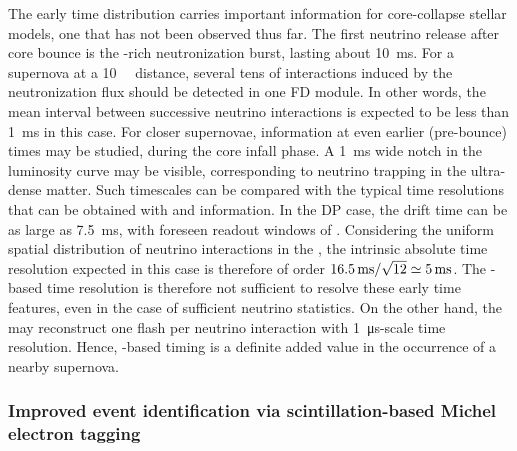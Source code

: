 The early time distribution carries important information for core-collapse stellar models, one that has not been observed thus far. The first neutrino release after core bounce is the \nue-rich neutronization burst, lasting about \SI{10}{\ms}. For a supernova at a \SI{10}{\kilo\parsec} distance, several tens of interactions induced by the neutronization flux should be detected in one FD module. In other words, the mean interval between successive neutrino interactions is expected to be less than \SI{1}{\ms} in this case. For closer supernovae, information at even earlier (pre-bounce) times may be studied, during the core infall phase. A \SI{1}{\ms} wide notch in the luminosity curve may be visible, corresponding to neutrino trapping in the ultra-dense matter. Such timescales can be compared with the typical time resolutions that can be obtained with  and  information. In the DP  case, the drift time can be as large as \SI{7.5}{\ms}, with foreseen readout windows of \dpreadout. Considering the uniform spatial distribution of neutrino interactions in the , the intrinsic absolute time resolution expected in this case is therefore of order $\dpreadout/\sqrt{12}\simeq \SI{5}{\ms}$. The -based time resolution is therefore not sufficient to resolve these early time features, even in the case of sufficient neutrino statistics. On the other hand, the  may reconstruct one flash per  neutrino interaction with \SI{1}{\micro\s}-scale time resolution. Hence, -based timing is a definite added value in the occurrence of a nearby supernova.

\subsubsection{Improved event identification via scintillation-based Michel electron tagging}

